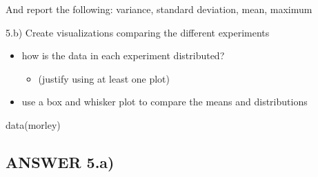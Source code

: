 \documentclass[
]{article}
\newenvironment{Shaded}{\begin{snugshade}}{\end{snugshade}}
\newcommand{\AttributeTok}[1]{\textcolor[rgb]{0.77,0.63,0.00}{#1}}
\newcommand{\FunctionTok}[1]{\textcolor[rgb]{0.00,0.00,0.00}{#1}}
\newcommand{\NormalTok}[1]{#1}
\newcommand{\OtherTok}[1]{\textcolor[rgb]{0.56,0.35,0.01}{#1}}
\newcommand{\SpecialCharTok}[1]{\textcolor[rgb]{0.00,0.00,0.00}{#1}}
\providecommand{\tightlist}{%
  \setlength{\itemsep}{0pt}\setlength{\parskip}{0pt}}
\begin{document}
And report the following: variance, standard deviation, mean, maximum

5.b) Create visualizations comparing the different experiments

\begin{itemize}
\tightlist
\item
  how is the data in each experiment distributed?

  \begin{itemize}
  \tightlist
  \item
    (justify using at least one plot)
  \end{itemize}
\item
  use a box and whisker plot to compare the means and distributions
\end{itemize}

\begin{Shaded}
\begin{Highlighting}[]
\FunctionTok{data}\NormalTok{(morley)}
\end{Highlighting}
\end{Shaded}

\hypertarget{answer-5.a}{%
\subsection{ANSWER 5.a)}\label{answer-5.a}}

\begin{Shaded}
\end{Shaded}
\end{document}

